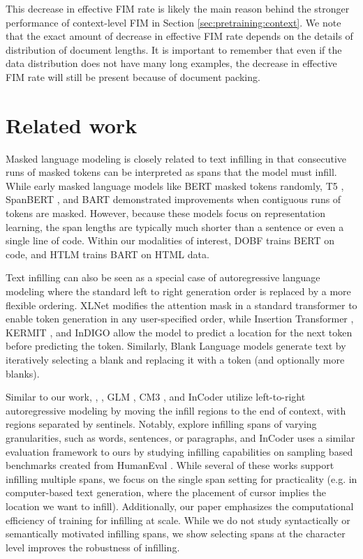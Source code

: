 \documentclass[postscript]{article}
\begin{document}
This decrease in effective FIM rate is likely the main reason behind the stronger performance of context-level FIM in Section \ref{sec:pretraining:context}. We note that the exact amount of decrease in effective FIM rate depends on the details of distribution of document lengths. It is important to remember that even if the data distribution does not have many long examples, the decrease in effective FIM rate will still be present because of document packing.


\section{Related work}\label{sec:related_work}

Masked language modeling is closely related to text infilling in that consecutive runs of masked tokens can be interpreted as spans that the model must infill. While early masked language models like BERT \citep{bert} masked tokens randomly, T5 \citep{T5}, SpanBERT \citep{spanbert}, and BART \citep{bart} demonstrated improvements when contiguous runs of tokens are masked. However, because these models focus on representation learning, the span lengths are typically much shorter than a sentence or even a single line of code. Within our modalities of interest, DOBF \citep{dobf} trains BERT on code, and HTLM \citep{htlm} trains BART on HTML data. 


Text infilling can also be seen as a special case of autoregressive language modeling where the standard left to right generation order is replaced by a more flexible ordering. XLNet \citep{xlnet} modifies the attention mask in a standard transformer to enable token generation in any user-specified order, while Insertion Transformer \citep{insertion-transformer}, KERMIT \citep{kermit}, and InDIGO \citep{indigo} allow the model to predict a location for the next token before predicting the token. Similarly, Blank Language models \citep{blanklm} generate text by iteratively selecting a blank and replacing it with a token (and optionally more blanks).

Similar to our work, \cite{zhu-infilling}, \cite{donahue}, GLM \citep{glm}, CM3 \citep{cm3}, and InCoder \citep{incoder} utilize left-to-right autoregressive modeling by moving the infill regions to the end of context, with regions separated by sentinels. Notably, \cite{donahue} explore infilling spans of varying granularities, such as words, sentences, or paragraphs, and InCoder \citep{incoder} uses a similar evaluation framework to ours by studying infilling capabilities on sampling based benchmarks created from HumanEval \citep{codex}. While several of these works support infilling multiple spans, we focus on the single span setting for practicality (e.g. in computer-based text generation, where the placement of cursor implies the location we want to infill). Additionally, our paper emphasizes the computational efficiency of training for infilling at scale. While we do not study syntactically or semantically motivated infilling spans, we show selecting spans at the character level improves the robustness of infilling.
\end{document}
